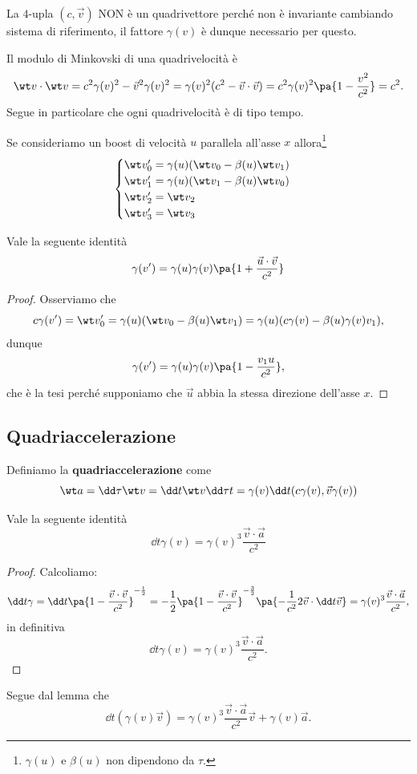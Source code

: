 \begin{remark}
La $4$-upla $(c,\vec v)$ NON \`e un quadrivettore perch\'e non \`e invariante cambiando sistema di riferimento, il fattore $\gamma(v)$ \`e dunque necessario per questo.
\end{remark}

\begin{remark}
Il modulo di Minkovski di una quadrivelocit\`a \`e
\[\wt v\cdot \wt v=c^2\gamma(v)^2-\vec v^2\gamma(v)^2=\gamma(v)^2(c^2-\vec v\cdot \vec v)=c^2\gamma(v)^2\pa{1-\frac{v^2}{c^2}}=c^2.\]
Segue in particolare che ogni quadrivelocit\`a \`e di tipo tempo.
\end{remark}

\noindent Se consideriamo un boost di velocit\`a $u$ parallela all'asse $x$ allora\footnote{$\gamma(u)$ e $\beta(u)$ non dipendono da $\tau$.}
\[\begin{cases}
\wt v_0'=\gamma(u)(\wt v_0-\beta(u)\wt v_1)\\
\wt v_1'=\gamma(u)(\wt v_1-\beta(u)\wt v_0)\\
\wt v_2'=\wt v_2\\
\wt v_3'=\wt v_3
\end{cases}\]

\begin{proposition}
Vale la seguente identit\`a
\[\gamma(v')=\gamma(u)\gamma(v)\pa{1+\frac{\vec u\cdot \vec v}{c^2}}\]
\end{proposition}
\begin{proof}
Osserviamo che
\[c\gamma(v')=\wt v_0'=\gamma(u)(\wt v_0-\beta(u)\wt v_1)=\gamma(u)(c\gamma(v)-\beta(u)\gamma(v)v_1),\]
dunque
\[\gamma(v')=\gamma(u)\gamma(v)\pa{1-\frac{v_1 u}{c^2}},\]
che \`e la tesi perch\'e supponiamo che $\vec u$ abbia la stessa direzione dell'asse $x$.
\end{proof}

\subsection{Quadriaccelerazione}
\begin{definition}[Quadriaccelerazione]
Definiamo la \textbf{quadriaccelerazione} come
\[\wt a=\dd\tau{\wt v}=\dd t{\wt v}\dd\tau t=\gamma(v)\dd t{}(c\gamma(v),\vec v\gamma(v))\]
\end{definition}
\begin{lemma}
Vale la seguente identit\`a
\[\boxed{\dd t{\gamma(v)}=\gamma(v)^3\frac{\vec v\cdot \vec a}{c^2}}\]
\end{lemma}
\begin{proof}
Calcoliamo:
\[\dd t\gamma=\dd t{}\pa{1-\frac{\vec v\cdot \vec v}{c^2}}^{-\frac12}=-\frac12\pa{1-\frac{\vec v\cdot \vec v}{c^2}}^{-\frac32}\pa{-\frac1{c^2}2\vec v\cdot \dd t{\vec v}}=\gamma(v)^3\frac{\vec v\cdot \vec a}{c^2},\]
in definitiva
\[{\dd t{\gamma(v)}=\gamma(v)^3\frac{\vec v\cdot \vec a}{c^2}}.\]
\end{proof}
\begin{corollary}
Segue dal lemma che
\[\dd t{}(\gamma(v)\vec v)=\gamma(v)^3\frac{\vec v\cdot \vec a}{c^2}\vec v+\gamma(v)\vec a.\]
\end{corollary}

